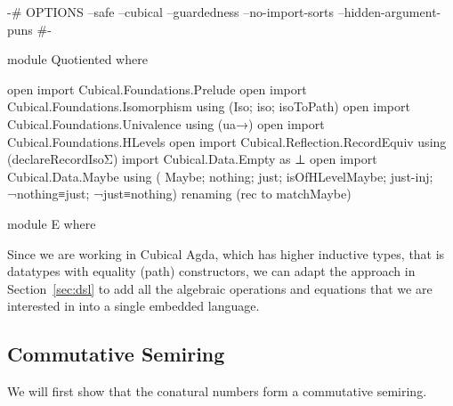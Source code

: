 \begin{code}[hide]
{-# OPTIONS
  --safe
  --cubical
  --guardedness
  --no-import-sorts
  --hidden-argument-puns #-}

module Quotiented where

open import Cubical.Foundations.Prelude
open import Cubical.Foundations.Isomorphism using (Iso; iso; isoToPath)
open import Cubical.Foundations.Univalence using (ua→)
open import Cubical.Foundations.HLevels
open import Cubical.Reflection.RecordEquiv using (declareRecordIsoΣ)
import Cubical.Data.Empty as ⊥
open import Cubical.Data.Maybe
  using
    ( Maybe; nothing; just;
      isOfHLevelMaybe; just-inj; ¬nothing≡just; ¬just≡nothing)
  renaming (rec to matchMaybe)

module E where
\end{code}
Since we are working in Cubical Agda, which has higher inductive types, that is
datatypes with equality (path) constructors, we can adapt the approach in
Section~\ref{sec:dsl} to add all the algebraic operations and equations that we
are interested in into a single embedded language.

\subsection{Commutative Semiring}

We will first show that the conatural numbers form a commutative semiring.

